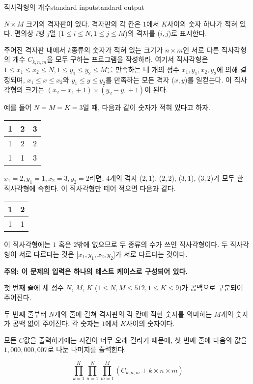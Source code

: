 \begin{problem}{직사각형의 개수}{standard input}{standard output}

$N \times M$ 크기의 격자판이 있다. 
격자판의 각 칸은 $1$에서 $K$사이의 숫자 하나가 적혀 있다. 
편의상 $i$행 $j$열 ($1 \le i \le N, 1 \le j \le M$)의 격자를 ($i, j$)로 표시한다.

주어진 격자판 내에서 $k$종류의 숫자가 적혀 있는 크기가 $n \times m$인 서로 다른 직사각형의 개수 $C_{k,n,m}$을 모두 구하는 프로그램을 작성하라. 
여기서 직사각형은 $1 \le x_1 \le x_2 \le N, 1 \le y_1 \le y_2 \le M$를 만족하는 네 개의 정수 $x_1, y_1, x_2, y_2$에 의해 결정되며, $x_1 \le x \le x_2$와 $y_1 \le y \le y_2$를 만족하는 모든 격자 ($x, y$)를 일컫는다. 
이 직사각형의 크기는 $(x_2-x_1+1) \times (y_2-y_1+1)$이 된다.

예를 들어 $N=M=K=3$일 때, 다음과 같이 숫자가 적혀 있다고 하자.

\begin{center}
\begin{tabular}{|c|c|c|}
\hline
  1 & 2 & 3 \\ \hline
  1 & 2 & 2 \\ \hline
  1 & 1 & 3 \\ \hline
\end{tabular}
\end{center}

$x_1=2, y_1=1, x_2=3, y_2=2$라면, $4$개의 격자 ($2, 1$), ($2, 2$), ($3, 1$), ($3, 2$)가 모두 한 직사각형에 속한다. 
이 직사각형만 떼어 적으면 다음과 같다.

\begin{center}
\begin{tabular}{|c|c|}
\hline
  1 & 2 \\ \hline
  1 & 1 \\ \hline
\end{tabular}
\end{center}

이 직사각형에는 $1$ 혹은 $2$밖에 없으므로 두 종류의 수가 쓰인 직사각형이다.
두 직사각형이 서로 다르다는 것은 [$x_1, y_1, x_2, y_2$]가 서로 다르다는 것이다.

\InputFile
\textbf{주의: 이 문제의 입력은 하나의 테스트 케이스로 구성되어 있다.}

첫 번째 줄에 세 정수 $N$, $M$, $K$ ($1 \le N, M \le 512, 1 \le K \le 9$)가 공백으로 구분되어 주어진다.

두 번째 줄부터 $N$개의 줄에 걸쳐 격자판의 각 칸에 적힌 숫자를 의미하는 $M$개의 숫자가 공백 없이 주어진다. 각 숫자는 $1$에서 $K$사이의 숫자이다.

\OutputFile
모든 $C$값을 출력하기에는 시간이 너무 오래 걸리기 때문에, 첫 번째 줄에 다음의 값을 $1,000,000,007$로 나눈 나머지를 출력한다.

$$\prod_{k=1}^{K}\prod_{n=1}^{N}\prod_{m=1}^{M} (C_{k, n, m} + k \times n \times m)$$

\Example

\begin{example}
%
%
%
\end{example}

\end{problem}
